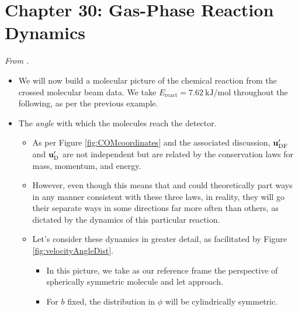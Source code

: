\documentclass[../notes.tex]{subfiles}
\begin{document}
\section{Chapter 30: Gas-Phase Reaction Dynamics}
\emph{From \textcite{bib:McQuarrieSimon}.}
\begin{itemize}
    \item {}We will now build a molecular picture of the  chemical reaction from the crossed molecular beam data. We take $E_\text{react}=\SI{7.62}{\kilo\joule\per\mole}$ throughout the following, as per the previous example.
    \item The \emph{angle} with which the molecules reach the detector.
    \begin{itemize}
        \item As per Figure \ref{fig:COMcoordinates} and the associated discussion, $\mathbf{u}_{\ce{DF}}'$ and $\mathbf{u}_{\ce{D}}'$ are not independent but are related by the conservation laws for mass, momentum, and energy.
        \item However, even though this means that  and  could theoretically part ways in any manner consistent with these three laws, in reality, they will go their separate ways in some directions far more often than others, as dictated by the dynamics of this particular reaction.
        \item Let's consider these dynamics in greater detail, as facilitated by Figure \ref{fig:velocityAngleDist}.
        \begin{itemize}
            \item In this picture, we take as our reference frame the perspective of spherically symmetric molecule  and let  approach.
            \item For $b$ fixed, the distribution in $\phi$ will be cylindrically symmetric.
        \end{itemize}
    \end{itemize}
\end{itemize}
\end{document}
